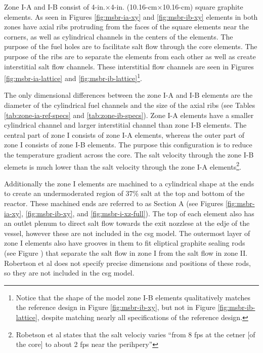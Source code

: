 Zone I-A and I-B consist of 4-in.$\times$4-in. (10.16-cm$\times$10.16-cm)
square graphite elements. As seen in Figures \ref{fig:msbr-ia-xy} and
\ref{fig:msbr-ib-xy} elements in both zones have axial ribs protruding from
the faces of the square elements near the corners, as well as cylindrical
channels in the centers of the elements. The purpose of the fuel holes are to
facilitate salt flow through the core elements. The purpose of the ribs are to
separate the elements from each other as well as create interstitial salt flow
channels\cite{robertson_conceptual_1971}. These interstitial flow channels
are seen in Figures \ref{fig:msbr-ia-lattice} and
\ref{fig:msbr-ib-lattice}\footnote{Notice that the shape of the model zone I-B
elements qualitatively matches the reference design in Figure
\ref{fig:msbr-ib-xy}, but  not in Figure \ref{fig:msbr-ib-lattice}, despite
matching nearly all specifications of the reference design.}.

The only dimensional differences between the zone I-A and I-B elements are the
diameter of the cylindrical fuel channels and the size of the axial ribs (see
Tables \ref{tab:zone-ia-ref-specs} and \ref{tab:zone-ib-specs}). Zone I-A
elements have a smaller cylindrical channel and larger interstitial channel
than zone I-B elements. The central part of zone I consists of zone I-A
elements, whereas the outer part of zone I consists of zone I-B
elements\cite{robertson_conceptual_1971}. The purpose this configuration is to
reduce the temperature gradient across the core. The salt velocity through the
zone I-B elemets is much lower than the salt velocity through the zone I-A
elements\footnote{Robetson et al states that the salt velociy varies ``from 8
fps at the cetner [of the core] to about 2 fps near the
perihpery''\cite{robertson_conceptual_1971}}.

Additionally the zone I elements are machined to a cylindrical shape at the ends
to create an undermoderated region of 37\% salt at the top and bottom of the
reactor\cite{robertson_conceptual_1971}. These machined ends are referred to as
Section A (see Figures \ref{fig:msbr-ia-xy}, \ref{fig:msbr-ib-xy}, and
\ref{fig:msbr-i-xz-full}). The top of each element also has an outlet plenum to
direct salt flow towards the exit nozzlese at the edje of the vessel, however
these are not included in the \Gls{csg} model. The outermost layer of zone I
elements also have grooves in them to fit eliptical graphite sealing rods (see
Figure \cite{fig:msbr-detail}) that separate the salt flow in zone I from the
salt flow in zone II\cite{robertson_conceptual_1971}. Robertson et al does not
specify precise dimensions and positions of these rods, so they are not included
in the \Gls{csg} model.

